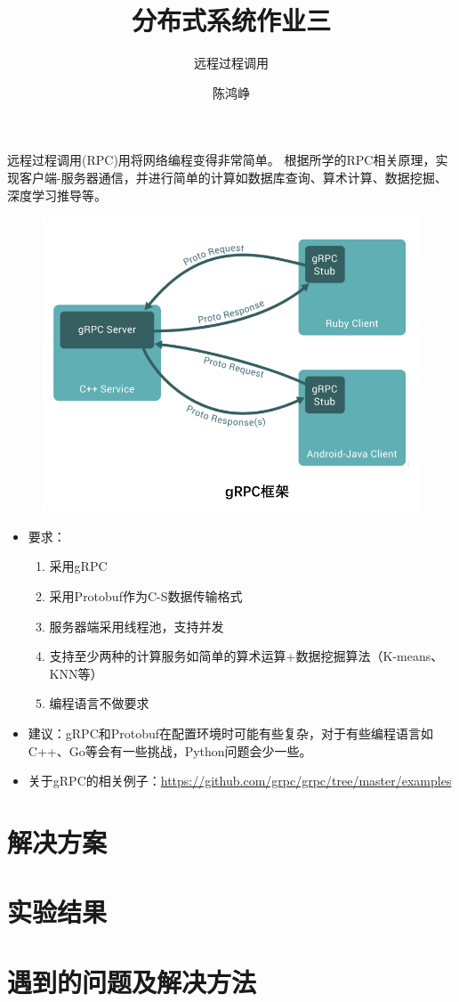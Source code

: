 \documentclass[logo,reportComp]{thesis}
\title{分布式系统作业三}
\subtitle{远程过程调用}
\author{陈鸿峥}
\begin{document}
\maketitle

\begin{question}
远程过程调用(RPC)用将网络编程变得非常简单。
根据所学的RPC相关原理，实现客户端-服务器通信，并进行简单的计算如数据库查询、算术计算、数据挖掘、深度学习推导等。
\begin{figure}[H]
\centering
\includegraphics[width=0.6\linewidth]{fig/gRPC-framework.png}
\end{figure}
\begin{itemize}
\item 要求：
\begin{enumerate}
\item 采用gRPC
\item 采用Protobuf作为C-S数据传输格式
\item 服务器端采用线程池，支持并发
\item 支持至少两种的计算服务如简单的算术运算+数据挖掘算法（K-means、KNN等）
\item 编程语言不做要求
\end{enumerate}
\item 建议：gRPC和Protobuf在配置环境时可能有些复杂，对于有些编程语言如C++、Go等会有一些挑战，Python问题会少一些。
\item 关于gRPC的相关例子：\url{https://github.com/grpc/grpc/tree/master/examples}
\end{itemize}
\end{question}

\section{解决方案}

\section{实验结果}

\section{遇到的问题及解决方法}

\end{document}
